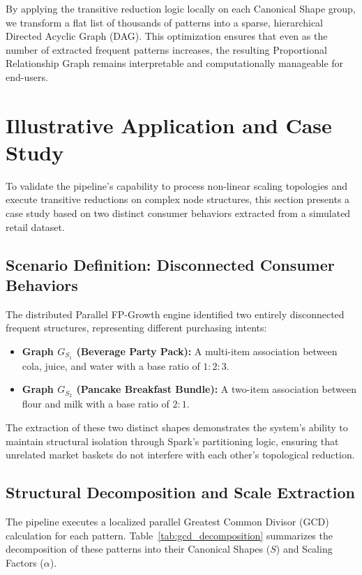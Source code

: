 \documentclass[10pt, twocolumn]{article}
\begin{document}
By applying the transitive reduction logic locally on each Canonical Shape
group, we transform a flat list of thousands of patterns into a sparse,
hierarchical Directed Acyclic Graph (DAG). This optimization ensures that even
as the number of extracted frequent patterns increases, the resulting
Proportional Relationship Graph remains interpretable and computationally
manageable for end-users.

\section{Illustrative Application and Case Study}

To validate the pipeline's capability to process non-linear scaling topologies
and execute transitive reductions on complex node structures, this section
presents a case study based on two distinct consumer behaviors extracted from a
simulated retail dataset.

\subsection{Scenario Definition: Disconnected Consumer Behaviors}

The distributed Parallel FP-Growth engine identified two entirely disconnected
frequent structures, representing different purchasing intents:

\begin{itemize}
    \item \textbf{Graph $G_{S_1}$ (Beverage Party Pack):} A multi-item
          association between cola, juice, and water with a base ratio of $1:2:3$.
    \item \textbf{Graph $G_{S_2}$ (Pancake Breakfast Bundle):} A two-item
          association between flour and milk with a base ratio of $2:1$.
\end{itemize}

The extraction of these two distinct shapes demonstrates the system's ability
to maintain structural isolation through Spark's partitioning logic, ensuring
that unrelated market baskets do not interfere with each other’s topological
reduction.

\subsection{Structural Decomposition and Scale Extraction}

The pipeline executes a localized parallel Greatest Common Divisor (GCD)
calculation for each pattern. Table~\ref{tab:gcd_decomposition} summarizes the
decomposition of these patterns into their Canonical Shapes ($S$) and Scaling
Factors ($\alpha$).
\end{document}
